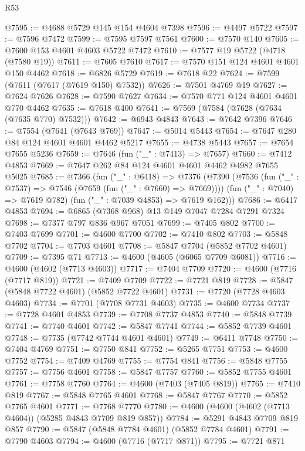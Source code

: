 \begin{lexlean}{R53}
\begin{coremodule}
@7595 := @4688 @5729 @145 @154 @4604 @7398
@7596 := @4497 @5722
@7597 := @7596 @7472
@7599 := @7595 @7597 @7561
@7600 := @7570 @140
@7605 := @7600 @153 @4601 @4603 @5722 @7472
@7610 := @7577 @19 @5722 (@4718 (@7580 @19))
@7611 := @7605 @7610
@7617 := @7570 @151 @124 @4601 @4601 @150 @4462
@7618 := @6826 @5729
@7619 := @7618 @22
@7624 := @7599 (@7611 (@7617 (@7619 @150) @7532))
@7626 := @7501 @4769 @19
@7627 := @7624 @7626
@7628 := @7590 @7627
@7634 := @7570 @771 @124 @4601 @4601 @770 @4462
@7635 := @7618 @400
@7641 := @7569 (@7584 (@7628 (@7634 (@7635 @770) @7532)))
@7642 := @6943 @4843
@7643 := @7642 @7396
@7646 := @7554 (@7641 (@7643 @769))
@7647 := @5014 @5443
@7654 := @7647 @280 @84 @124 @4601 @4601 @4462 @5217
@7655 := @4738 @5443
@7657 := @7654 @7655 @5236
@7659 := @7646 (fun ("_" : @7413) => @7657)
@7660 := @7412 @4853
@7669 := @7647 @262 @84 @124 @4601 @4601 @4462 @4982 @7655 @5025
@7685 := @7366
    (fun ("_" : @6418) =>
    @7376
      (@7390
        (@7536 (fun ("_" : @7537) => @7546 (@7659 (fun ("_" : @7660) => @7669))))
        (fun ("_" : @7040) => @7619 @782)
        (fun ("_" : @7039 @4853) => @7619 @162)))
@7686 := @6417 @4853
@7694 := @6865 (@7368 @968) @13 @149 @7047 @7284 @7291 @7324
@7698 := @7377 @797 @836 @967 @7051
@7699 := @7405 @802
@7700 := @7403 @7699
@7701 := @4600 @7700
@7702 := @7410 @802
@7703 := @5848 @7702
@7704 := @7703 @4601
@7708 := @5847 @7704 (@5852 @7702 @4601)
@7709 := @7395 @71
@7713 := @4600 (@4605 (@6065 @7709 @6081))
@7716 := @4600 (@4602 (@7713 @4603))
@7717 := @7404 @7709
@7720 := @4600 (@7716 (@7717 @819))
@7721 := @7409 @7709
@7722 := @7721 @819
@7728 := @5847 (@5848 @7722 @4601) (@5852 @7722 @4601)
@7731 := @7720 (@7728 @4603 @4603)
@7734 := @7701 (@7708 @7731 @4603)
@7735 := @4600 @7734
@7737 := @7728 @4601 @4853
@7739 := @7708 @7737 @4853
@7740 := @5848 @7739
@7741 := @7740 @4601
@7742 := @5847 @7741
@7744 := @5852 @7739 @4601
@7748 := @7735 (@7742 @7744 @4601 @4601)
@7749 := @6411 @7748
@7750 := @7404 @4769
@7751 := @7750 @841
@7752 := @5265 @7751
@7753 := @4600 @7752
@7754 := @7409 @4769
@7755 := @7754 @841
@7756 := @5848 @7755
@7757 := @7756 @4601
@7758 := @5847 @7757
@7760 := @5852 @7755 @4601
@7761 := @7758 @7760
@7764 := @4600 (@7403 (@7405 @819))
@7765 := @7410 @819
@7767 := @5848 @7765 @4601
@7768 := @5847 @7767
@7770 := @5852 @7765 @4601
@7771 := @7768 @7770
@7780 := @4600 (@4600 (@4602 (@7713 @4604)) (@5285 @4843 @7709 @819 @857))
@7784 := @5291 @4843 @7709 @819 @857
@7790 := @5847 (@5848 @7784 @4601) (@5852 @7784 @4601)
@7791 := @7790 @4603
@7794 := @4600 (@7716 (@7717 @871))
@7795 := @7721 @871

\end{coremodule}
\end{lexlean}
